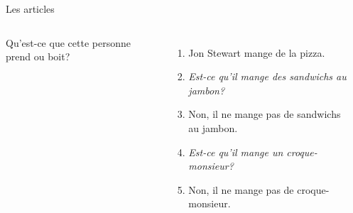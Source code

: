 \begin{frame}{Les articles}
  \begin{columns}
      Qu'est-ce que cette personne prend ou boit?
      \begin{enumerate}
        \item<2-> Jon Stewart mange de la pizza.
        \item<2-> \emph{Est-ce qu'il mange des sandwichs au jambon?}
        \item<3-> Non, il ne mange pas de sandwichs au jambon.
        \item<3-> \emph{Est-ce qu'il mange un croque-monsieur?}
        \item<4-> Non, il ne mange pas de croque-monsieur.
      \end{enumerate}
      \begin{minipage}[c][0.6\textwidth]{\linewidth}
        \begin{center}
        \end{center}
      \end{minipage}
  \end{columns}
\end{frame}


